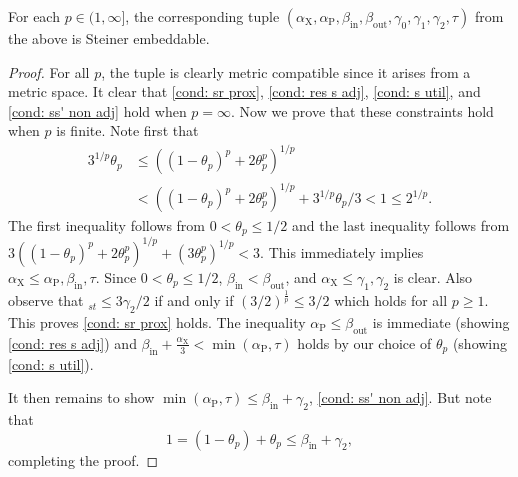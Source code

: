 \documentclass{theoretics}
\newcommand{\1}{\textbf{1}}
\newcommand{\td}{\tau}
\newcommand{\pcoord}{\theta_p}
\newcommand{\srd}{\alpha_{\text{X}}}
\newcommand{\trd}{\alpha_{\text{P}}}
\begin{document}
\begin{proposition} \label{prop: l_p Steiner embed}
For each $p \in (1, \infty]$, the corresponding tuple $(\srd, \trd, \beta_{\text{in}}, \beta_{\text{out}}, \gamma_0, \gamma_1, \gamma_2, \td)$ from the above is Steiner embeddable.
\end{proposition}
\begin{proof}
For all $p$, the tuple is clearly metric compatible since it arises from a metric space. It clear that \ref{cond: sr prox}, \ref{cond: res s adj}, \ref{cond: s util}, and \ref{cond: ss' non adj} hold when $p = \infty$. Now we prove that these constraints hold when $p$ is finite. Note first 
that
\begin{align*}
3^{1/p}\pcoord &\leq ((1-\pcoord)^p + 2\pcoord^p)^{1/p} \\
&< ((1-\pcoord)^p + 2\pcoord^p)^{1/p} + 3^{1/p}\pcoord/3 < 1 \leq 2^{1/p}.
\end{align*}
The first inequality follows from $0 < \pcoord \leq 1/2$ and the last inequality follows from $3 ((1-\pcoord)^p + 2\pcoord^p)^{1/p} + (3\pcoord^p)^{1/p} < 3.$ This immediately implies $\srd \leq \trd, \beta_{\text{in}}, \td$. Since $0 < \pcoord \leq 1/2$, $\beta_{\text{in}} < \beta_{\text{out}}$, and $\srd \leq \gamma_1, \gamma_2$ is clear. Also observe that $_{st} \leq 3\gamma_2/2$ if and only if $(3/2)^{\frac{1}{p}} \leq 3/2$ which holds for all $p \geq 1$. This proves \ref{cond: sr prox} holds. The inequality $\trd \leq \beta_{\text{out}}$ is immediate (showing \ref{cond: res s adj}) and $\beta_{\text{in}} + \frac{\srd}{3} < \min(\trd, \td)$ holds by our choice of $\pcoord$ (showing \ref{cond: s util}). 

It then remains to show $\min(\trd, \td) \leq \beta_{\text{in}} + \gamma_2$, \ref{cond: ss' non adj}. But note that 
\[
1 = (1 - \pcoord) + \pcoord \leq \beta_{\text{in}} + \gamma_2,
\]
completing the proof.
\end{proof}
\end{document}
